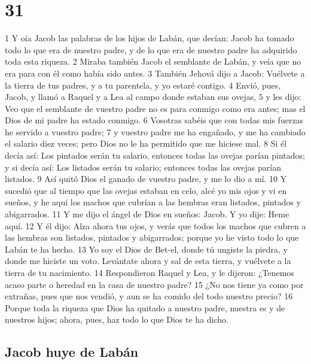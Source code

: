 \chapter{31}

1 Y oía Jacob las palabras de los hijos de Labán, que decían: Jacob ha tomado todo lo que era de nuestro padre, y de lo que era de nuestro padre ha adquirido toda esta riqueza.
2 Miraba también Jacob el semblante de Labán, y veía que no era para con él como había sido antes.
3 También Jehová dijo a Jacob: Vuélvete a la tierra de tus padres, y a tu parentela, y yo estaré contigo.
4 Envió, pues, Jacob, y llamó a Raquel y a Lea al campo donde estaban sus ovejas,
5 y les dijo: Veo que el semblante de vuestro padre no es para conmigo como era antes; mas el Dios de mi padre ha estado conmigo.
6 Vosotras sabéis que con todas mis fuerzas he servido a vuestro padre;
7 y vuestro padre me ha engañado, y me ha cambiado el salario diez veces; pero Dios no le ha permitido que me hiciese mal.
8 Si él decía así: Los pintados serán tu salario, entonces todas las ovejas parían pintados; y si decía así: Los listados serán tu salario; entonces todas las ovejas parían listados.
9 Así quitó Dios el ganado de vuestro padre, y me lo dio a mí.
10 Y sucedió que al tiempo que las ovejas estaban en celo, alcé yo mis ojos y vi en sueños, y he aquí los machos que cubrían a las hembras eran listados, pintados y abigarrados.
11 Y me dijo el ángel de Dios en sueños: Jacob. Y yo dije: Heme aquí.
12 Y él dijo: Alza ahora tus ojos, y verás que todos los machos que cubren a las hembras son listados, pintados y abigarrados; porque yo he visto todo lo que Labán te ha hecho.
13 Yo soy el Dios de Bet-el, donde tú ungiste la piedra, y donde me hiciste un voto. Levántate ahora y sal de esta tierra, y vuélvete a la tierra de tu nacimiento.
14 Respondieron Raquel y Lea, y le dijeron: ¿Tenemos acaso parte o heredad en la casa de nuestro padre?
15 ¿No nos tiene ya como por extrañas, pues que nos vendió, y aun se ha comido del todo nuestro precio?
16 Porque toda la riqueza que Dios ha quitado a nuestro padre, nuestra es y de nuestros hijos; ahora, pues, haz todo lo que Dios te ha dicho.

\section*{Jacob huye de Labán}

